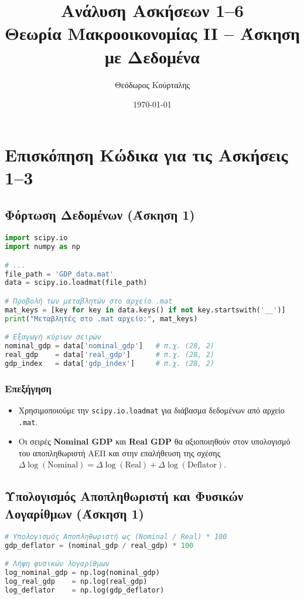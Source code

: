 \documentclass{book}
\title{\textbf{Ανάλυση Ασκήσεων 1--6} \\
\large Θεωρία Μακροοικονομίας II -- Άσκηση με Δεδομένα}
\author{Θεόδωρος Κούρταλης}
\date{\today}
\begin{document}
\maketitle
\tableofcontents
\newpage




\chapter{Επισκόπηση Κώδικα για τις Ασκήσεις 1--3}

\section{Φόρτωση Δεδομένων (Άσκηση 1)}
\begin{tcolorbox}[colback=white,colframe=black,title=Βασικός Κώδικας Python για Φόρτωση Αρχείου .mat]
\begin{lstlisting}[language=Python]
import scipy.io
import numpy as np

# ...
file_path = 'GDP_data.mat'
data = scipy.io.loadmat(file_path)

# Προβολή των μεταβλητών στο αρχείο .mat
mat_keys = [key for key in data.keys() if not key.startswith('__')]
print("Μεταβλητές στο .mat αρχείο:", mat_keys)

# Εξαγωγή κύριων σειρών
nominal_gdp = data['nominal_gdp']   # π.χ. (28, 2)
real_gdp    = data['real_gdp']      # π.χ. (28, 2)
gdp_index   = data['gdp_index']     # π.χ. (28, 2)
\end{lstlisting}
\end{tcolorbox}

\subsection*{Επεξήγηση}
\begin{itemize}
  \item Χρησιμοποιούμε την \texttt{scipy.io.loadmat} για διάβασμα δεδομένων από αρχείο \texttt{.mat}.
  \item Οι σειρές \textbf{Nominal GDP} και \textbf{Real GDP} θα αξιοποιηθούν στον υπολογισμό του αποπληθωριστή ΑΕΠ και στην επαλήθευση της σχέσης \(\Delta \log(\text{Nominal}) = \Delta \log(\text{Real}) + \Delta \log(\text{Deflator})\).
\end{itemize}

\section{Υπολογισμός Αποπληθωριστή και Φυσικών Λογαρίθμων (Άσκηση 1)}
\begin{tcolorbox}[colback=white,colframe=black,title=Υπολογισμός Αποπληθωριστή ΑΕΠ και Λογαρίθμων]
\begin{lstlisting}[language=Python]
# Υπολογισμός Αποπληθωριστή ως (Nominal / Real) * 100
gdp_deflator = (nominal_gdp / real_gdp) * 100

# Λήψη φυσικών λογαρίθμων
log_nominal_gdp = np.log(nominal_gdp)
log_real_gdp    = np.log(real_gdp)
log_deflator    = np.log(gdp_deflator)
\end{lstlisting}
\end{tcolorbox}
\end{document}
